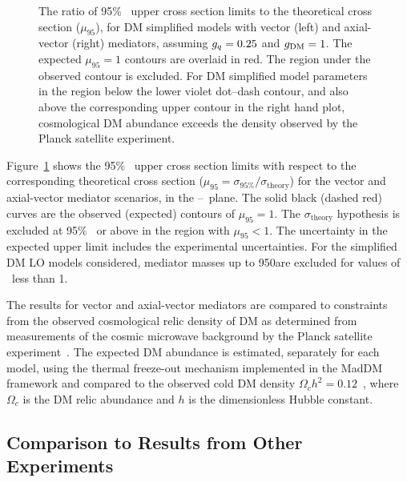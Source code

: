 \begin{figure}[htbp]
{  }
  \caption{
    The ratio of 95\% \CL\ upper cross section limits to the theoretical cross section ($\mu_{95}$), for DM simplified models with vector (left) and axial-vector (right) mediators, assuming $g_{{q}}=0.25$ and $g_{\text{DM}}=1$.
    The expected $\mu_{95} = 1$ contours are overlaid in red. 
    The region under the observed contour is excluded.
    For DM simplified model parameters in the region below the lower violet dot--dash contour, and also above the corresponding upper contour in the right hand plot, cosmological DM abundance exceeds the density observed by the Planck satellite experiment.
  }
  \label{fig:limits}
\end{figure}

Figure~\ref{fig:limits} shows the 95\% \CL\ upper cross section limits with respect to the corresponding theoretical cross section ($\mu_{95}= \sigma_{95\%}/\sigma_{\text{theory}}$) for the  vector and axial-vector mediator scenarios, in the \mmed--\mdm\ plane. 
The solid black (dashed red) curves are the observed (expected) contours of $\mu_{95} = 1$. 
The $\sigma_{\text{theory}}$ hypothesis is excluded at 95\% \CL\ or above in the region with $\mu_{95} < 1$. 
The uncertainty in the expected upper limit includes the experimental uncertainties. 
For the simplified DM LO models considered, mediator masses up to 950\GeV are excluded for values of \mdm\ less than 1\GeV.

The results for vector and axial-vector mediators are compared to constraints
from the observed cosmological relic density of DM as determined from measurements of the cosmic microwave background by the Planck satellite experiment~\cite{Ade:2015xua}.
The expected DM abundance is estimated, separately for each model, using the thermal freeze-out mechanism implemented in the {\sc MadDM}~\cite{Backovic:2013dpa} framework and  compared to the observed cold DM density $\Omega_c h^2=0.12$~\cite{Ade:2015xua}, where $\Omega_c$ is the DM relic abundance and $h$ is the dimensionless Hubble constant.

\subsection{Comparison to Results from Other Experiments}
\label{sec:comparison}

